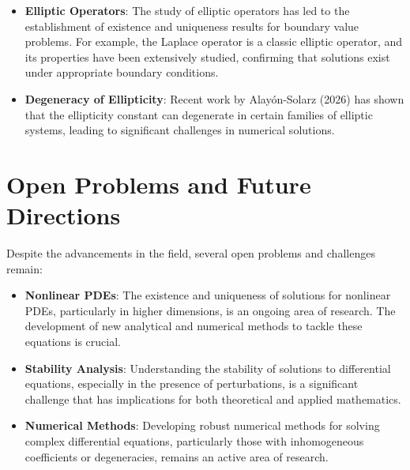 \documentclass[11pt,a4paper]{article}
\begin{document}
\begin{itemize}
\item \textbf{Elliptic Operators}: The study of elliptic operators has led to the establishment of existence and uniqueness results for boundary value problems. For example, the Laplace operator is a classic elliptic operator, and its properties have been extensively studied, confirming that solutions exist under appropriate boundary conditions.
\end{itemize}

\begin{itemize}
\item \textbf{Degeneracy of Ellipticity}: Recent work by Alayón-Solarz (2026) has shown that the ellipticity constant can degenerate in certain families of elliptic systems, leading to significant challenges in numerical solutions.
\end{itemize}

\section{Open Problems and Future Directions}

Despite the advancements in the field, several open problems and challenges remain:

\begin{itemize}
\item \textbf{Nonlinear PDEs}: The existence and uniqueness of solutions for nonlinear PDEs, particularly in higher dimensions, is an ongoing area of research. The development of new analytical and numerical methods to tackle these equations is crucial.
\end{itemize}

\begin{itemize}
\item \textbf{Stability Analysis}: Understanding the stability of solutions to differential equations, especially in the presence of perturbations, is a significant challenge that has implications for both theoretical and applied mathematics.
\end{itemize}

\begin{itemize}
\item \textbf{Numerical Methods}: Developing robust numerical methods for solving complex differential equations, particularly those with inhomogeneous coefficients or degeneracies, remains an active area of research.
\end{itemize}
\end{document}
